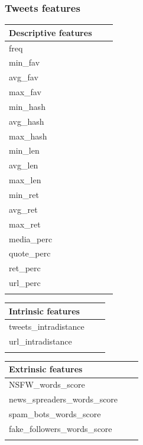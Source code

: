 \subsubsection{Tweets features}
\small
\begin{center}
	\begin{tabular}{lll}
		\textbf{Descriptive features}\\
		\hline\hline
		freq\\
		min\_fav\\
		avg\_fav\\
		max\_fav\\
		min\_hash\\
		avg\_hash\\
		max\_hash\\
		min\_len\\
		avg\_len\\
		max\_len\\
		min\_ret\\
		avg\_ret\\
		max\_ret\\
		media\_perc\\
		quote\_perc\\
		ret\_perc\\
		url\_perc\\\hline\\
	\end{tabular}
\end{center}

\begin{center}
	\begin{tabular}{lll}
		\textbf{Intrinsic features}\\
		\hline\hline
		tweets\_intradistance\\
		url\_intradistance\\\hline\\
	\end{tabular}
\end{center}


\begin{center}
	\begin{tabular}{lll}
		\textbf{Extrinsic features}\\
		\hline\hline
		NSFW\_words\_score\\
		news\_spreaders\_words\_score\\
		spam\_bots\_words\_score\\
		fake\_followers\_words\_score\\
		\hline\\
	\end{tabular}
\end{center}

